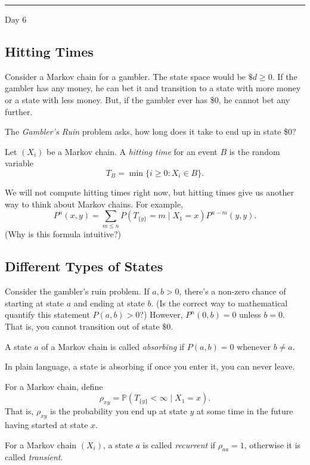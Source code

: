 \documentclass{problemset}
\newcommand{\1}{\mathbf{1}}
\renewcommand{\P}{\mathbb{P}}
\newcommand{\fatrule}[1]{\vspace{.3cm}\hrule {\hfill \sf #1}\par}
\begin{document}
	\fatrule{Day 6}

	\subsection*{Hitting Times}

	Consider a Markov chain for a gambler.  The state space would be $\$d\geq 0$.  If the gambler has any money,
	he can bet it and transition to a state with more money or a state with less money.  But, if the gambler 
	ever has \$0, he cannot bet any further.

	The \emph{Gambler's Ruin} problem asks, how long does it take to end up in state \$0?

	\begin{definition}
		Let $(X_i)$ be a Markov chain.  A \emph{hitting time} for an event $B$ is the random
		variable 
		\[
			T_B = \min\{i\geq 0: X_i\in B\}.
		\]
	\end{definition}

	We will not compute hitting times right now, but hitting times give us another way to think
	about Markov chains.  For example,
	\[
		P^n(x,y) = \sum_{m\leq n} P(T_{\{y\}}=m\mid X_1=x)P^{n-m}(y,y).
	\]
	(Why is this formula intuitive?)

	\subsection*{Different Types of States}

	Consider the gambler's ruin problem.  If $a,b>0$, there's a non-zero chance
	of starting at state $a$ and ending at state $b$.  (Is the correct way to
	mathematical quantify this statement $P(a,b)>0$?)  However, $P^n(0,b)=0$ unless $b=0$.
	That is, you cannot transition out of state $\$0$.

	\begin{definition}[Absorbing]
		A state $a$ of a Markov chain is called \emph{absorbing} if
		$P(a,b)=0$ whenever $b\neq a$.
	\end{definition}

	In plain language, a state is absorbing if once
	you enter it, you can never leave.

	For a Markov chain, define
	\[
		\rho_{xy} = \P(T_{\{y\}} < \infty\mid X_1=x).
	\]
	That is, $\rho_{xy}$ is the probability you end up at state $y$ at some
	time in the future having started at state $x$.

	\begin{definition}
		For a Markov chain $(X_i)$, a state $a$ is called \emph{recurrent}
		if $\rho_{aa}=1$, otherwise it is called \emph{transient}.
	\end{definition}
\end{document}
